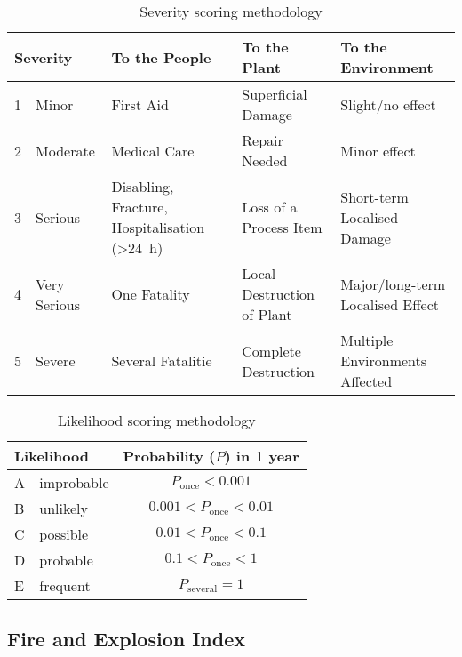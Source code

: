 \begin{table}[H]
\centering
\caption{Severity scoring methodology}
\label{tab:severity-methodology}
\begin{tabularx}{\linewidth}{llXXX}
\toprule
\multicolumn{2}{l}{\textbf{Severity}} & \textbf{To the People}                                     & \textbf{To the Plant}      & \textbf{To the Environment}      \\ \midrule
1          & Minor             & First Aid                                                  & Superficial Damage         & Slight/no effect                 \\
2          & Moderate          & Medical Care                                               & Repair Needed              & Minor effect                     \\
3          & Serious           & Disabling, Fracture, Hospitalisation (\SI{>24}{\hour})     & Loss of a Process Item     & Short-term Localised Damage      \\
4          & Very Serious      & One Fatality                                               & Local Destruction of Plant & Major/long-term Localised Effect \\
5          & Severe            & Several Fatalitie                                          & Complete Destruction       & Multiple Environments Affected   \\ \bottomrule
\end{tabularx}
\end{table}

\begin{table}[H]
\centering
\caption{Likelihood scoring methodology}
\label{tab:likelihood-methodology}
\begin{tabular}{llc}
\toprule
\multicolumn{2}{l}{Likelihood} & Probability ($P$) in 1 year              \\ \midrule
A & improbable & $         P_\mathrm{once} < 0.001 $ \\
B & unlikely   & $ 0.001 < P_\mathrm{once} < 0.01  $ \\
C & possible   & $ 0.01  < P_\mathrm{once} < 0.1   $ \\
D & probable   & $ 0.1   < P_\mathrm{once} < 1     $ \\
E & frequent   & $         P_\mathrm{several} = 1  $ \\ \bottomrule
\end{tabular}
\end{table}

\subsection{Fire and Explosion Index}

